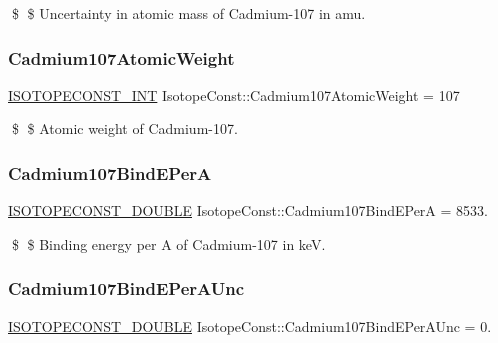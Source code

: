 \$ \$ Uncertainty in atomic mass of Cadmium-\/107 in amu. \mbox{\label{group___isotope_const-_cadmium-_cd107_ga2baeb1d5a1f7f430f23e312dc528d41c}} 
\subsubsection{\texorpdfstring{Cadmium107\+Atomic\+Weight}{Cadmium107AtomicWeight}}
{\footnotesize\ttfamily \mbox{\hyperlink{group___isotope_const-_macros_ga5f18360b3e99483a35c32d789e62621c}{I\+S\+O\+T\+O\+P\+E\+C\+O\+N\+S\+T\+\_\+\+I\+NT}} Isotope\+Const\+::\+Cadmium107\+Atomic\+Weight = 107}

\$ \$ Atomic weight of Cadmium-\/107. \mbox{\label{group___isotope_const-_cadmium-_cd107_gae027a55822d32feb24c123fc11f98271}} 
\subsubsection{\texorpdfstring{Cadmium107\+Bind\+E\+PerA}{Cadmium107BindEPerA}}
{\footnotesize\ttfamily \mbox{\hyperlink{group___isotope_const-_macros_ga8f45a7272ce02c0b4c65c44636ed719a}{I\+S\+O\+T\+O\+P\+E\+C\+O\+N\+S\+T\+\_\+\+D\+O\+U\+B\+LE}} Isotope\+Const\+::\+Cadmium107\+Bind\+E\+PerA = 8533.}

\$ \$ Binding energy per A of Cadmium-\/107 in keV. \mbox{\label{group___isotope_const-_cadmium-_cd107_gaffd3544d613d0fe8df25ebc474e1380c}} 
\subsubsection{\texorpdfstring{Cadmium107\+Bind\+E\+Per\+A\+Unc}{Cadmium107BindEPerAUnc}}
{\footnotesize\ttfamily \mbox{\hyperlink{group___isotope_const-_macros_ga8f45a7272ce02c0b4c65c44636ed719a}{I\+S\+O\+T\+O\+P\+E\+C\+O\+N\+S\+T\+\_\+\+D\+O\+U\+B\+LE}} Isotope\+Const\+::\+Cadmium107\+Bind\+E\+Per\+A\+Unc = 0.}

